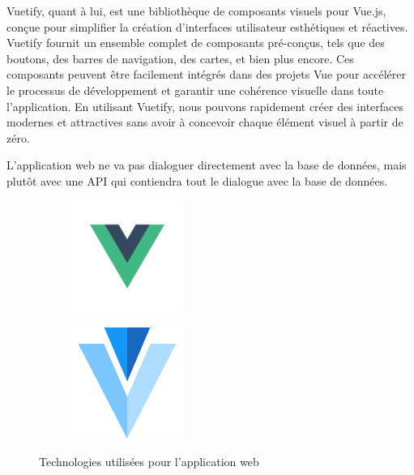 Vuetify, quant à lui, est une bibliothèque de composants visuels pour Vue.js, conçue pour simplifier la création d'interfaces utilisateur esthétiques et réactives. Vuetify fournit un ensemble complet de composants pré-conçus, tels que des boutons, des barres de navigation, des cartes, et bien plus encore. Ces composants peuvent être facilement intégrés dans des projets Vue pour accélérer le processus de développement et garantir une cohérence visuelle dans toute l'application. En utilisant Vuetify, nous pouvons rapidement créer des interfaces modernes et attractives sans avoir à concevoir chaque élément visuel à partir de zéro.

L'application web ne va pas dialoguer directement avec la base de données, mais plutôt avec une API qui contiendra tout le dialogue avec la base de données.

\begin{figure}
	\centering
	\begin{subfigure}{.45\textwidth}
		\centering
		\includegraphics[width=0.40\textwidth]{assets/vue.png}
		\label{fig:vue}
	\end{subfigure}
	\begin{subfigure}{.45\textwidth}
		\centering
		\includegraphics[width=0.40\textwidth]{assets/vuetify.png}
		\label{fig:vuetify}
	\end{subfigure}
	\caption{Technologies utilisées pour l'application web}
\end{figure}

